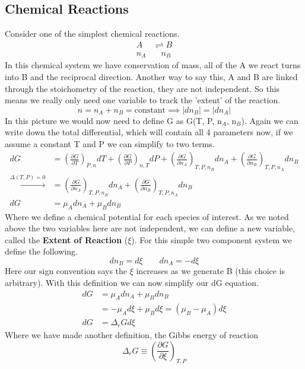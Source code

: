 \documentclass{article}
\begin{document}
\subsection*{Chemical Reactions}
Consider one of the simplest chemical reactions.
\begin{equation}\begin{split}
    A &\rightleftharpoons B \\
    n_A &\quad n_B
    \end{split}
\end{equation}
In this chemical system we have conservation of mass, all of the A we react turns into B and the reciprocal direction. 
Another way to say this, A and B are linked through the stoichometry of the reaction, they are not independent. 
So this means we really only need one variable to track the 'extent' of the reaction. 
\begin{equation}
    n = n_A + n_B = \text{constant} \implies |dn_B| = |dn_A|
\end{equation}
In this picture we would now need to define G as G(T, P, n$_A$, n$_B$). 
Again we can write down the total differential, which will contain all 4 parameters now, if we assume a constant T and P we can simplify to two terms. 
\begin{equation}
\begin{split}
dG &= \left(\frac{\partial G}{\partial T}\right)_{P,n}dT +  \left(\frac{\partial G}{\partial P}\right)_{n,T}dP + \left(\frac{\partial G}{\partial n_A}\right)_{T,P,n_B}dn_A + \left(\frac{\partial G}{\partial n_B}\right)_{T,P,n_A}dn_B \\
\xrightarrow{\Delta(T,P)=0}&= \left(\frac{\partial G}{\partial n_A}\right)_{T,P,n_B}dn_A + \left(\frac{\partial G}{\partial n_B}\right)_{T,P,n_A}dn_B \\
dG &= \mu_Adn_A + \mu_B dn_B
\end{split}
\end{equation}
Where we define a chemical potential for each species of interest. 
As we noted above the two variables here are not independent, we can define a new variable, called the \textbf{Extent of Reaction} ($\xi$). 
For this simple two component system we define the following. 
\begin{equation}
dn_B = d\xi \qquad dn_A = -d\xi
\end{equation}
Here our sign convention says the $\xi$ increases as we generate B (this choice is arbitrary). 
With this definition we can now simplify our dG equation. 
\begin{equation}
\begin{split}
    dG &= \mu_Adn_A + \mu_B dn_B \\
    &= -\mu_Ad\xi + \mu_B d\xi = (\mu_B - \mu_A)d\xi \\
    dG &= \Delta_rGd\xi
\end{split}
\end{equation}
Where we have made another definition, the Gibbs energy of reaction 
\begin{equation}
\Delta_rG \equiv \left(\frac{\partial G}{\partial \xi}\right)_{T,P}
\end{equation}
\end{document}
